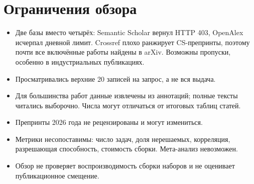 \documentclass[11pt,a4paper]{article}
\begin{document}
\section{Ограничения обзора}

\begin{itemize}
  \item Две базы вместо четырёх: Semantic Scholar вернул HTTP 403, OpenAlex
        исчерпал дневной лимит. Crossref плохо ранжирует CS-препринты,
        поэтому почти все включённые работы найдены в arXiv. Возможны
        пропуски, особенно в индустриальных публикациях.
  \item Просматривались верхние 20 записей на запрос, а не вся выдача.
  \item Для большинства работ данные извлечены из аннотаций; полные тексты
        читались выборочно. Числа могут отличаться от итоговых таблиц
        статей.
  \item Препринты 2026 года не рецензированы и могут измениться.
  \item Метрики несопоставимы: число задач, доля нерешаемых, корреляция,
        разрешающая способность, стоимость сборки. Мета-анализ невозможен.
  \item Обзор не проверяет воспроизводимость сборки наборов и не оценивает
        публикационное смещение.
\end{itemize}



\end{document}
